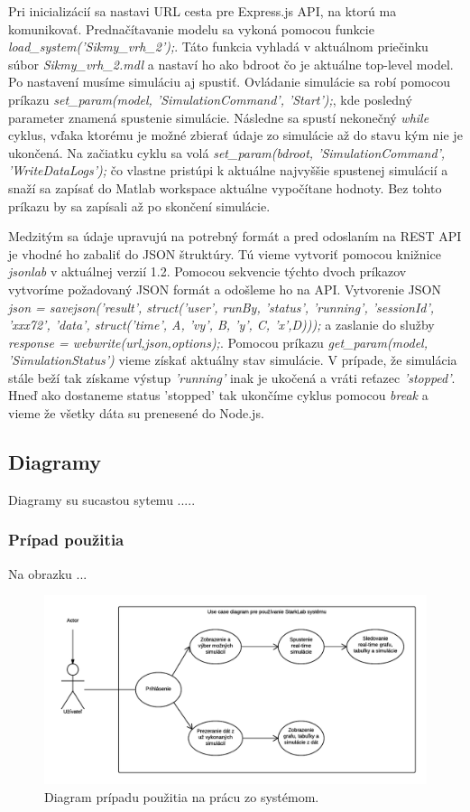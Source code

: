 Pri inicializácií sa nastavi URL cesta pre Express.js API, na ktorú ma komunikovať. Prednačítavanie modelu sa vykoná pomocou funkcie \textit{load\_system('Sikmy\_vrh\_2');}. Táto funkcia vyhladá v aktuálnom priečinku súbor \textit{Sikmy\_vrh\_2.mdl} a nastaví ho ako bdroot čo je aktuálne top-level model. Po nastavení musíme simuláciu aj spustiť. Ovládanie simulácie sa robí pomocou príkazu \textit{set\_param(model, 'SimulationCommand', 'Start');}, kde posledný parameter znamená spustenie simulácie.
Následne sa spustí nekonečný \textit{while} cyklus, vďaka ktorému je možné zbierať údaje zo simulácie až do stavu kým nie je ukončená. 
Na začiatku cyklu sa volá \textit{set\_param(bdroot, 'SimulationCommand', 'WriteDataLogs');} čo vlastne pristúpi k aktuálne najvyššie spustenej simulácií a snaží sa zapísať do Matlab workspace aktuálne vypočítane hodnoty. Bez tohto príkazu by sa zapísali až po skončení simulácie.

Medzitým sa údaje upravujú na potrebný formát a pred odoslaním na REST API je vhodné ho zabaliť do JSON štruktúry. Tú vieme vytvoriť pomocou knižnice \textit{jsonlab} v aktuálnej verzií 1.2.
Pomocou sekvencie týchto dvoch príkazov vytvoríme požadovaný JSON formát a odošleme ho na API. Vytvorenie JSON \textit{json = savejson('result', struct('user', runBy, 'status', 'running', 'sessionId', 'xxx72', 'data', struct('time', A, 'vy', B, 'y', C, 'x',D)));} a zaslanie do služby \textit{response = webwrite(url,json,options);}. Pomocou príkazu \textit{get\_param(model, 'SimulationStatus')} vieme získať aktuálny stav simulácie. V prípade, že simulácia stále beží tak získame výstup \textit{'running'} inak je ukočená a vráti reťazec \textit{'stopped'}. Hneď ako dostaneme status 'stopped' tak ukončíme cyklus pomocou \textit{break} a vieme že všetky dáta su prenesené do Node.js.

\subsection{Diagramy}
Diagramy su sucastou sytemu .....

\subsubsection{Prípad použitia}
Na obrazku ...

\begin{figure}[H]
  \centering
  \includegraphics[scale=0.7]{img/diagrams/use-case.png}
  \caption{Diagram prípadu použitia na prácu zo systémom.}
  \label{img-use-case}
\end{figure}

